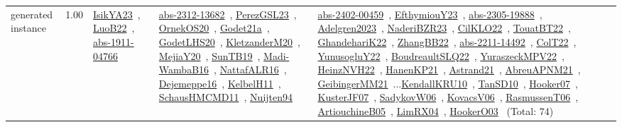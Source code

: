 {\begin{longtable}{p{3cm}r>{\raggedright\arraybackslash}p{6cm}>{\raggedright\arraybackslash}p{6cm}>{\raggedright\arraybackslash}p{8cm}}
\index{generated instance}\index{Benchmarks!generated instance}generated instance &  1.00 & \href{../works/IsikYA23.pdf}{IsikYA23}~\cite{IsikYA23}, \href{../works/LuoB22.pdf}{LuoB22}~\cite{LuoB22}, \href{../works/abs-1911-04766.pdf}{abs-1911-04766}~\cite{abs-1911-04766} & \href{../works/abs-2312-13682.pdf}{abs-2312-13682}~\cite{abs-2312-13682}, \href{../works/PerezGSL23.pdf}{PerezGSL23}~\cite{PerezGSL23}, \href{../works/OrnekOS20.pdf}{OrnekOS20}~\cite{OrnekOS20}, \href{../works/Godet21a.pdf}{Godet21a}~\cite{Godet21a}, \href{../works/GodetLHS20.pdf}{GodetLHS20}~\cite{GodetLHS20}, \href{../works/KletzanderM20.pdf}{KletzanderM20}~\cite{KletzanderM20}, \href{../works/MejiaY20.pdf}{MejiaY20}~\cite{MejiaY20}, \href{../works/SunTB19.pdf}{SunTB19}~\cite{SunTB19}, \href{../works/Madi-WambaB16.pdf}{Madi-WambaB16}~\cite{Madi-WambaB16}, \href{../works/NattafALR16.pdf}{NattafALR16}~\cite{NattafALR16}, \href{../works/Dejemeppe16.pdf}{Dejemeppe16}~\cite{Dejemeppe16}, \href{../works/KelbelH11.pdf}{KelbelH11}~\cite{KelbelH11}, \href{../works/SchausHMCMD11.pdf}{SchausHMCMD11}~\cite{SchausHMCMD11}, \href{../works/Nuijten94.pdf}{Nuijten94}~\cite{Nuijten94} & \href{../works/abs-2402-00459.pdf}{abs-2402-00459}~\cite{abs-2402-00459}, \href{../works/EfthymiouY23.pdf}{EfthymiouY23}~\cite{EfthymiouY23}, \href{../works/abs-2305-19888.pdf}{abs-2305-19888}~\cite{abs-2305-19888}, \href{../works/Adelgren2023.pdf}{Adelgren2023}~\cite{Adelgren2023}, \href{../works/NaderiBZR23.pdf}{NaderiBZR23}~\cite{NaderiBZR23}, \href{../works/CilKLO22.pdf}{CilKLO22}~\cite{CilKLO22}, \href{../works/TouatBT22.pdf}{TouatBT22}~\cite{TouatBT22}, \href{../works/GhandehariK22.pdf}{GhandehariK22}~\cite{GhandehariK22}, \href{../works/ZhangBB22.pdf}{ZhangBB22}~\cite{ZhangBB22}, \href{../works/abs-2211-14492.pdf}{abs-2211-14492}~\cite{abs-2211-14492}, \href{../works/ColT22.pdf}{ColT22}~\cite{ColT22}, \href{../works/YunusogluY22.pdf}{YunusogluY22}~\cite{YunusogluY22}, \href{../works/BoudreaultSLQ22.pdf}{BoudreaultSLQ22}~\cite{BoudreaultSLQ22}, \href{../works/YuraszeckMPV22.pdf}{YuraszeckMPV22}~\cite{YuraszeckMPV22}, \href{../works/HeinzNVH22.pdf}{HeinzNVH22}~\cite{HeinzNVH22}, \href{../works/HanenKP21.pdf}{HanenKP21}~\cite{HanenKP21}, \href{../works/Astrand21.pdf}{Astrand21}~\cite{Astrand21}, \href{../works/AbreuAPNM21.pdf}{AbreuAPNM21}~\cite{AbreuAPNM21}, \href{../works/GeibingerMM21.pdf}{GeibingerMM21}~\cite{GeibingerMM21}...\href{../works/KendallKRU10.pdf}{KendallKRU10}~\cite{KendallKRU10}, \href{../works/TanSD10.pdf}{TanSD10}~\cite{TanSD10}, \href{../works/Hooker07.pdf}{Hooker07}~\cite{Hooker07}, \href{../works/KusterJF07.pdf}{KusterJF07}~\cite{KusterJF07}, \href{../works/SadykovW06.pdf}{SadykovW06}~\cite{SadykovW06}, \href{../works/KovacsV06.pdf}{KovacsV06}~\cite{KovacsV06}, \href{../works/RasmussenT06.pdf}{RasmussenT06}~\cite{RasmussenT06}, \href{../works/ArtiouchineB05.pdf}{ArtiouchineB05}~\cite{ArtiouchineB05}, \href{../works/LimRX04.pdf}{LimRX04}~\cite{LimRX04}, \href{../works/HookerO03.pdf}{HookerO03}~\cite{HookerO03} (Total: 74)\\

\end{longtable}}
